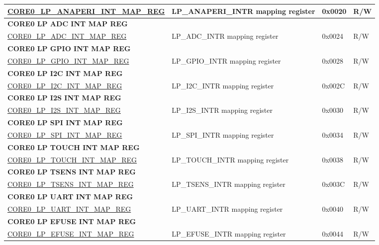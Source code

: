\begin{longtable}{ | p{7.5cm} | p{7.2cm} | p{1.3cm} | p{1cm} | }
\hyperref[regdesc:CORE0LPANAPERIINTMAPREG]{CORE0\_LP\_ANAPERI\_INT\_MAP\_REG} & LP\_ANAPERI\_INTR mapping register & 0x0020 & R/W \\ \hline
\multicolumn{4}{|l|}{\textbf{CORE0 LP ADC INT MAP REG}} \\ \hline
\hyperref[regdesc:CORE0LPADCINTMAPREG]{CORE0\_LP\_ADC\_INT\_MAP\_REG} & LP\_ADC\_INTR mapping register & 0x0024 & R/W \\ \hline
\multicolumn{4}{|l|}{\textbf{CORE0 LP GPIO INT MAP REG}} \\ \hline
\hyperref[regdesc:CORE0LPGPIOINTMAPREG]{CORE0\_LP\_GPIO\_INT\_MAP\_REG} & LP\_GPIO\_INTR mapping register & 0x0028 & R/W \\ \hline
\multicolumn{4}{|l|}{\textbf{CORE0 LP I2C INT MAP REG}} \\ \hline
\hyperref[regdesc:CORE0LPI2CINTMAPREG]{CORE0\_LP\_I2C\_INT\_MAP\_REG} & LP\_I2C\_INTR mapping register & 0x002C & R/W \\ \hline
\multicolumn{4}{|l|}{\textbf{CORE0 LP I2S INT MAP REG}} \\ \hline
\hyperref[regdesc:CORE0LPI2SINTMAPREG]{CORE0\_LP\_I2S\_INT\_MAP\_REG} & LP\_I2S\_INTR mapping register & 0x0030 & R/W \\ \hline
\multicolumn{4}{|l|}{\textbf{CORE0 LP SPI INT MAP REG}} \\ \hline
\hyperref[regdesc:CORE0LPSPIINTMAPREG]{CORE0\_LP\_SPI\_INT\_MAP\_REG} & LP\_SPI\_INTR mapping register & 0x0034 & R/W \\ \hline
\multicolumn{4}{|l|}{\textbf{CORE0 LP TOUCH INT MAP REG}} \\ \hline
\hyperref[regdesc:CORE0LPTOUCHINTMAPREG]{CORE0\_LP\_TOUCH\_INT\_MAP\_REG} & LP\_TOUCH\_INTR mapping register & 0x0038 & R/W \\ \hline
\multicolumn{4}{|l|}{\textbf{CORE0 LP TSENS INT MAP REG}} \\ \hline
\hyperref[regdesc:CORE0LPTSENSINTMAPREG]{CORE0\_LP\_TSENS\_INT\_MAP\_REG} & LP\_TSENS\_INTR mapping register & 0x003C & R/W \\ \hline
\multicolumn{4}{|l|}{\textbf{CORE0 LP UART INT MAP REG}} \\ \hline
\hyperref[regdesc:CORE0LPUARTINTMAPREG]{CORE0\_LP\_UART\_INT\_MAP\_REG} & LP\_UART\_INTR mapping register & 0x0040 & R/W \\ \hline
\multicolumn{4}{|l|}{\textbf{CORE0 LP EFUSE INT MAP REG}} \\ \hline
\hyperref[regdesc:CORE0LPEFUSEINTMAPREG]{CORE0\_LP\_EFUSE\_INT\_MAP\_REG} & LP\_EFUSE\_INTR mapping register & 0x0044 & R/W \\ \hline

\end{longtable}
